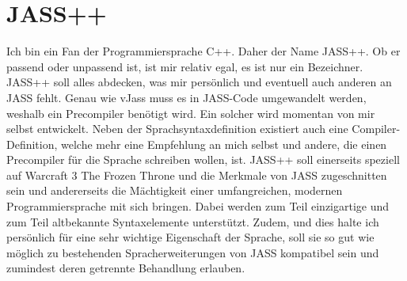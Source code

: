 \section { JASS++ }
Ich bin ein Fan der Programmiersprache C++. Daher der Name JASS++. Ob er passend oder unpassend ist, ist mir relativ egal, es ist nur ein Bezeichner.
JASS++ soll alles abdecken, was mir persönlich und eventuell auch anderen an JASS fehlt.
Genau wie vJass muss es in JASS-Code umgewandelt werden, weshalb ein Precompiler benötigt wird. Ein solcher wird momentan von mir selbst entwickelt.
Neben der Sprachsyntaxdefinition existiert auch eine Compiler-Definition, welche mehr eine Empfehlung an mich selbst und andere, die einen Precompiler
für die Sprache schreiben wollen, ist.
JASS++ soll einerseits speziell auf Warcraft 3 The Frozen Throne und die Merkmale von JASS zugeschnitten sein und andererseits die Mächtigkeit einer
umfangreichen, modernen Programmiersprache mit sich bringen.
Dabei werden zum Teil einzigartige und zum Teil altbekannte Syntaxelemente unterstützt.
Zudem, und dies halte ich persönlich für eine sehr wichtige Eigenschaft der Sprache, soll sie so gut wie möglich zu bestehenden Spracherweiterungen
von JASS kompatibel sein und zumindest deren getrennte Behandlung erlauben.

